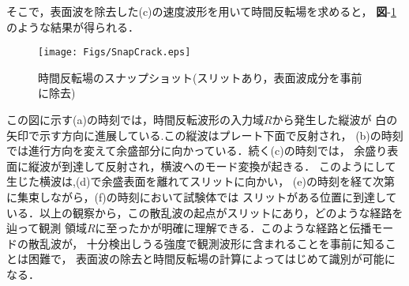 そこで，表面波を除去した(c)の速度波形を用いて時間反転場を求めると，
{\bf 図}-\ref{fig:snap_crack}のような結果が得られる．
\begin{figure}[thb]
\centering
	\texttt{[image: Figs/SnapCrack.eps]}
	\caption{時間反転場のスナップショット(スリットあり，表面波成分を事前に除去)}
	\label{fig:snap_crack}
\end{figure}
この図に示す(a)の時刻では，時間反転波形の入力域$R$から発生した縦波が
白の矢印で示す方向に進展している.この縦波はプレート下面で反射され，
(b)の時刻では進行方向を変えて余盛部分に向かっている．続く(c)の時刻では，
余盛り表面に縦波が到達して反射され，横波へのモード変換が起きる．
このようにして生じた横波は,(d)で余盛表面を離れてスリットに向かい，
(e)の時刻を経て次第に集束しながら，(f)の時刻において試験体では
スリットがある位置に到達している．以上の観察から，この散乱波の起点がスリットにあり，どのような経路を辿って観測
領域$R$に至ったかが明確に理解できる．このような経路と伝播モードの散乱波が，
十分検出しうる強度で観測波形に含まれることを事前に知ることは困難で，
表面波の除去と時間反転場の計算によってはじめて識別が可能になる．
